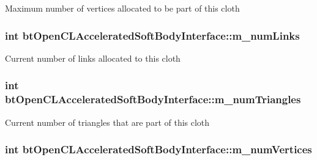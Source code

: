 Maximum number of vertices allocated to be part of this cloth \hypertarget{classbt_open_c_l_accelerated_soft_body_interface_a34f2f02626d058ee305fe5f66b3ee0a2}{
\subsubsection[{m\+\_\+num\+Links}]{\setlength{\rightskip}{0pt plus 5cm}int bt\+Open\+C\+L\+Accelerated\+Soft\+Body\+Interface\+::m\+\_\+num\+Links\hspace{0.3cm}{\ttfamily [protected]}}}\label{classbt_open_c_l_accelerated_soft_body_interface_a34f2f02626d058ee305fe5f66b3ee0a2}
Current number of links allocated to this cloth \hypertarget{classbt_open_c_l_accelerated_soft_body_interface_a294ea06835204cca54467b44312940fd}{
\subsubsection[{m\+\_\+num\+Triangles}]{\setlength{\rightskip}{0pt plus 5cm}int bt\+Open\+C\+L\+Accelerated\+Soft\+Body\+Interface\+::m\+\_\+num\+Triangles\hspace{0.3cm}{\ttfamily [protected]}}}\label{classbt_open_c_l_accelerated_soft_body_interface_a294ea06835204cca54467b44312940fd}
Current number of triangles that are part of this cloth \hypertarget{classbt_open_c_l_accelerated_soft_body_interface_a7066f48b63d0a783e0527eb66489aae3}{
\subsubsection[{m\+\_\+num\+Vertices}]{\setlength{\rightskip}{0pt plus 5cm}int bt\+Open\+C\+L\+Accelerated\+Soft\+Body\+Interface\+::m\+\_\+num\+Vertices\hspace{0.3cm}{\ttfamily [protected]}}}\label{classbt_open_c_l_accelerated_soft_body_interface_a7066f48b63d0a783e0527eb66489aae3}
